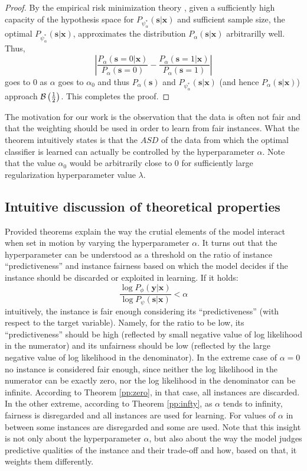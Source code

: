 \documentclass[preprint,12pt]{elsarticle}
\begin{document}
\begin{proof}
By the empirical risk minimization theory \cite{Vapnik,Shalev}, given a sufficiently high capacity of the hypothesis space for $P_{\psi^*_\alpha}(\mathbf{s}|\mathbf{x})$ and sufficient sample size, the optimal $P_{\psi^*_\alpha}(\mathbf{s}|\mathbf{x})$, approximates the distribution $P_\alpha(\mathbf{s}|\mathbf{x})$ arbitrarilly well. Thus,
$$\left|\frac{P_\alpha(\mathbf{s}=0|\mathbf{x})}{P_\alpha(\mathbf{s}=0)}-\frac{P_\alpha(\mathbf{s}=1|\mathbf{x})}{P_\alpha(\mathbf{s}=1)}\right|$$
goes to $0$ as $\alpha$ goes to $\alpha_0$ and thus $P_\alpha(\mathbf{s})$ and $P_{\psi^*_\alpha}(\mathbf{s}|\mathbf{x})$ (and hence $P_\alpha(\mathbf{s}|\mathbf{x})$) approach ${\cal B}\left(\frac{1}{2}\right)$. This completes the proof.
\end{proof}
The motivation for our work is the observation that the data is often not fair and that the weighting should be used in order to learn from fair instances. What the theorem intuitively states is that the $ASD$ of the data from which the optimal classifier is learned can actually be controlled by the hyperparameter $\alpha$. Note that the value $\alpha_0$ would be arbitrarily close to $0$ for sufficiently large regularization hyperparameter value $\lambda$.

\subsection{Intuitive discussion of theoretical properties}

Provided theorems explain the way the crutial elements of the model interact when set in motion by varying the hyperparameter $\alpha$. It turns out that the hyperparameter can be understood as a threshold on the ratio of instance ``predictiveness'' and instance fairness based on which the model decides if the instance should be discarded or exploited in learning.
If it holds:
\begin{equation}
\frac{\log P_{\phi}(\mathbf{y}|\mathbf{x})}{\log P_{\psi}(\mathbf{s}|\mathbf{x})}<\alpha
\end{equation}
intuitively, the instance is fair enough considering its ``predictiveness'' (with respect to the target variable). Namely, for the ratio to be low, its ``predictiveness'' should be high (reflected by small negative value of log likelihood in the numerator) and its unfairness should be low (reflected by the large negative value of log likelihood in the denominator). In the extreme case of $\alpha=0$ no instance is considered fair enough, since neither the log likelihood in the numerator can be exactly zero, nor the log likelihood in the denominator can be infinite. According to Theorem \ref{pp:zero}, in that case, all instances are discarded. In the other extreme, according to Theorem \ref{pp:infty}, as $\alpha$ tends to infinity, fairness is disregarded and all instances are used for learning. For values of $\alpha$ in between some instances are disregarded and some are used. Note that this insight is not only about the hyperparameter $\alpha$, but also about the way the model judges predictive qualities of the instance and their trade-off and how, based on that, it weights them differently.
\end{document}
